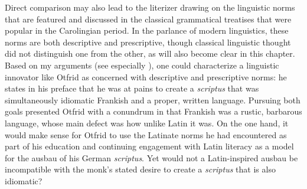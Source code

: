 Direct comparison may also lead to the literizer drawing on the linguistic norms that are featured and discussed in the classical grammatical treatises that were popular in the Carolingian period. In the parlance of modern linguistics, these norms are both descriptive and prescriptive, though classical linguistic thought did not distinguish one from the other, as will also become clear in this chapter. Based on my  arguments (see especially ), one could characterize a linguistic innovator like Otfrid as concerned with descriptive and prescriptive norms: he states in his preface that he was at pains to create a \textit{scriptus} that was simultaneously idiomatic Frankish and a proper, written language. Pursuing both goals presented Otfrid with a conundrum in that Frankish was a rustic, barbarous language, whose main defect was how unlike Latin it was. On the one hand, it would make sense for Otfrid to use the Latinate norms he had encountered as part of his education and continuing engagement with Latin literacy as a model for the ausbau of his German \textit{scriptus}. Yet would not a Latin-inspired ausbau be incompatible with the monk’s stated desire to create a \textit{scriptus} that is also idiomatic?

